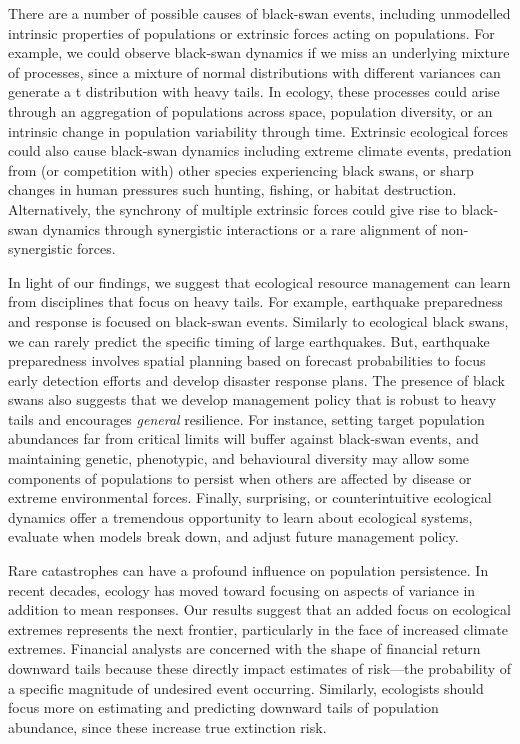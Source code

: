 There are a number of possible causes of black-swan events, including
unmodelled intrinsic properties of populations or extrinsic forces acting on
populations. For example, we could observe black-swan dynamics if we miss an
underlying mixture of processes, since a mixture of normal distributions with
different variances can generate a t distribution with heavy
tails\cite{allen2001}. In ecology, these processes could arise through an
aggregation of populations across space, population
diversity\cite{schindler2010}, or an intrinsic change in population variability
through time\cite{carpenter2006}. Extrinsic ecological forces could also cause
black-swan dynamics\cite{nunez2012} including extreme climate
events\cite{meehl2004, katz2005, ipcc2012}, predation from (or competition
with) other species experiencing black swans, or sharp changes in human
pressures such hunting, fishing, or habitat destruction. Alternatively, the
synchrony of multiple extrinsic forces could give rise to black-swan dynamics
through synergistic interactions\cite{kirby2009} or a rare alignment of
non-synergistic forces\cite{denny2009}.

In light of our findings, we suggest that ecological resource management can
learn from disciplines that focus on heavy tails. For example, earthquake
preparedness and response is focused on black-swan events. Similarly to
ecological black swans, we can rarely predict the specific timing of large
earthquakes. But, earthquake preparedness involves spatial planning based on
forecast probabilities to focus early detection efforts and develop disaster
response plans\cite{nrc2007}. The presence of black swans also suggests that we
develop management policy that is robust to heavy tails and encourages
\textit{general} resilience\cite{carpenter2012}. For instance, setting target
population abundances far from critical limits will buffer against black-swan
events\cite{caddy1996}, and maintaining genetic, phenotypic, and behavioural
diversity may allow some components of populations to persist when others are
affected by disease or extreme environmental forces\cite{schindler2010}.
Finally, surprising, or counterintuitive ecological dynamics offer a tremendous
opportunity to learn about ecological systems, evaluate when models break down,
and adjust future management policy\cite{doak2008, lindenmayer2010}.

Rare catastrophes can have a profound influence on population
persistence\cite{mangel1994}. In recent decades, ecology has moved toward
focusing on aspects of variance in addition to mean
responses\cite{thompson2013}. Our results suggest that an added focus on
ecological extremes represents the next frontier, particularly in the face of
increased climate extremes\cite{meehl2004, ipcc2012, thompson2013}. Financial
analysts are concerned with the shape of financial return downward tails
because these directly impact estimates of risk---the probability of a specific
magnitude of undesired event occurring. Similarly, ecologists should focus more
on estimating and predicting downward tails of population abundance, since
these increase true extinction risk.

